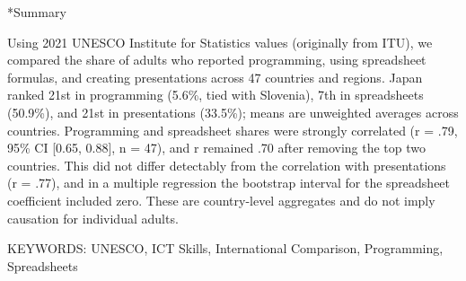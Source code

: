 \documentclass[a4paper,10pt,twocolumn]{ltjsarticle}
\makeatletter
\renewcommand{\section}{\@startsection{section}{1}{\z@}{1.1\Cvs \@plus.4\Cdp \@minus.2\Cdp}{.5\Cvs \@plus.2\Cdp}{\normalfont\gtfamily\bfseries\large}}
\makeatother
\begin{document}
\section*{Summary}
{\footnotesize\setlength{\parindent}{0pt}Using 2021 UNESCO Institute for Statistics values (originally from ITU), we compared the share of adults who reported programming, using spreadsheet formulas, and creating presentations across 47 countries and regions. Japan ranked 21st in programming (5.6\%, tied with Slovenia), 7th in spreadsheets (50.9\%), and 21st in presentations (33.5\%); means are unweighted averages across countries. Programming and spreadsheet shares were strongly correlated (r = .79, 95\% CI [0.65, 0.88], n = 47), and r remained .70 after removing the top two countries. This did not differ detectably from the correlation with presentations (r = .77), and in a multiple regression the bootstrap interval for the spreadsheet coefficient included zero. These are country-level aggregates and do not imply causation for individual adults.\par\smallskip KEYWORDS: UNESCO, ICT Skills, International Comparison, Programming, Spreadsheets\par}
\medskip\noindent{}
\end{document}
